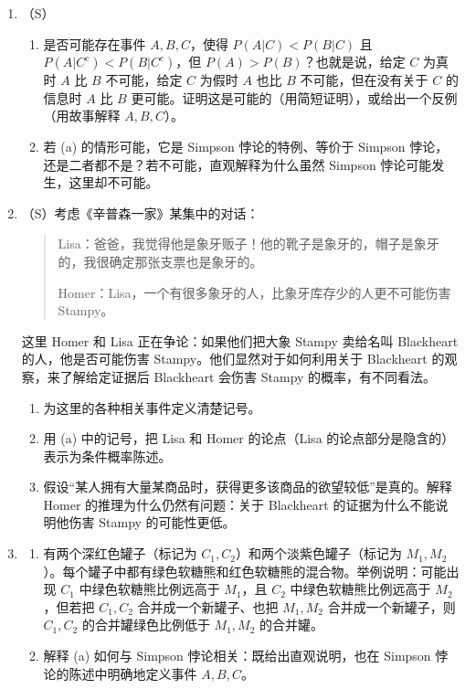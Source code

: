 \documentclass[UTF8,12pt,a4paper,fontset=fandol]{ctexart}
\begin{document}
\begin{enumerate}
\subsection*{Simpson 悖论}

  \item （S）
  \begin{enumerate}
    \item 是否可能存在事件 $A,B,C$，使得 $P(A|C)<P(B|C)$ 且 $P(A|C^c)<P(B|C^c)$，但 $P(A)>P(B)$？也就是说，给定 $C$ 为真时 $A$ 比 $B$ 不可能，给定 $C$ 为假时 $A$ 也比 $B$ 不可能，但在没有关于 $C$ 的信息时 $A$ 比 $B$ 更可能。证明这是可能的（用简短证明），或给出一个反例（用故事解释 $A,B,C$）。
    \item 若 (a) 的情形可能，它是 Simpson 悖论的特例、等价于 Simpson 悖论，还是二者都不是？若不可能，直观解释为什么虽然 Simpson 悖论可能发生，这里却不可能。
  \end{enumerate}

  \item （S）考虑《辛普森一家》某集中的对话：
  \begin{quote}
  Lisa：爸爸，我觉得他是象牙贩子！他的靴子是象牙的，帽子是象牙的，我很确定那张支票也是象牙的。

  Homer：Lisa，一个有很多象牙的人，比象牙库存少的人更不可能伤害 Stampy。
  \end{quote}
  这里 Homer 和 Lisa 正在争论：如果他们把大象 Stampy 卖给名叫 Blackheart 的人，他是否可能伤害 Stampy。他们显然对于如何利用关于 Blackheart 的观察，来了解给定证据后 Blackheart 会伤害 Stampy 的概率，有不同看法。
  \begin{enumerate}
    \item 为这里的各种相关事件定义清楚记号。
    \item 用 (a) 中的记号，把 Lisa 和 Homer 的论点（Lisa 的论点部分是隐含的）表示为条件概率陈述。
    \item 假设“某人拥有大量某商品时，获得更多该商品的欲望较低”是真的。解释 Homer 的推理为什么仍然有问题：关于 Blackheart 的证据为什么不能说明他伤害 Stampy 的可能性更低。
  \end{enumerate}

  \item
  \begin{enumerate}
    \item 有两个深红色罐子（标记为 $C_1,C_2$）和两个淡紫色罐子（标记为 $M_1,M_2$）。每个罐子中都有绿色软糖熊和红色软糖熊的混合物。举例说明：可能出现 $C_1$ 中绿色软糖熊比例远高于 $M_1$，且 $C_2$ 中绿色软糖熊比例远高于 $M_2$，但若把 $C_1,C_2$ 合并成一个新罐子、也把 $M_1,M_2$ 合并成一个新罐子，则 $C_1,C_2$ 的合并罐绿色比例低于 $M_1,M_2$ 的合并罐。
    \item 解释 (a) 如何与 Simpson 悖论相关：既给出直观说明，也在 Simpson 悖论的陈述中明确地定义事件 $A,B,C$。
  \end{enumerate}


\end{enumerate}
\end{document}
